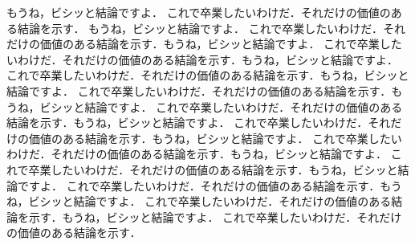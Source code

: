 %
%
\label{cha:ketsuron}

もうね，ビシッと結論ですよ．
これで卒業したいわけだ．それだけの価値のある結論を示す．
もうね，ビシッと結論ですよ．
これで卒業したいわけだ．それだけの価値のある結論を示す．もうね，ビシッと結論ですよ．
これで卒業したいわけだ．それだけの価値のある結論を示す．もうね，ビシッと結論ですよ．
これで卒業したいわけだ．それだけの価値のある結論を示す．もうね，ビシッと結論ですよ．
これで卒業したいわけだ．それだけの価値のある結論を示す．もうね，ビシッと結論ですよ．
これで卒業したいわけだ．それだけの価値のある結論を示す．もうね，ビシッと結論ですよ．
これで卒業したいわけだ．それだけの価値のある結論を示す．もうね，ビシッと結論ですよ．
これで卒業したいわけだ．それだけの価値のある結論を示す．もうね，ビシッと結論ですよ．
これで卒業したいわけだ．それだけの価値のある結論を示す．もうね，ビシッと結論ですよ．
これで卒業したいわけだ．それだけの価値のある結論を示す．もうね，ビシッと結論ですよ．
これで卒業したいわけだ．それだけの価値のある結論を示す．もうね，ビシッと結論ですよ．
これで卒業したいわけだ．それだけの価値のある結論を示す．